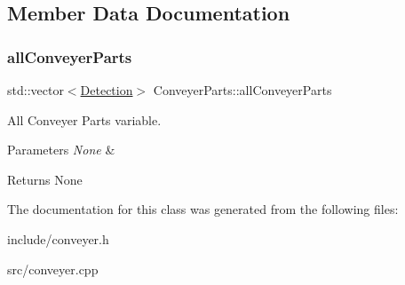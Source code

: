 \subsection{Member Data Documentation}
\mbox{\label{classConveyerParts_ab75ade698ffee71ccf3792d22917eb95}} 
\subsubsection{\texorpdfstring{all\+Conveyer\+Parts}{allConveyerParts}}
{\footnotesize\ttfamily std\+::vector$<$\hyperlink{classDetection}{Detection}$>$ Conveyer\+Parts\+::all\+Conveyer\+Parts}



All Conveyer Parts variable. 


\begin{DoxyParams}{Parameters}
{\em None} & \\
\hline
\end{DoxyParams}
\begin{DoxyReturn}{Returns}
None 
\end{DoxyReturn}


The documentation for this class was generated from the following files\+:\begin{DoxyCompactItemize}
\item 
include/conveyer.\+h\item 
src/conveyer.\+cpp\end{DoxyCompactItemize}
